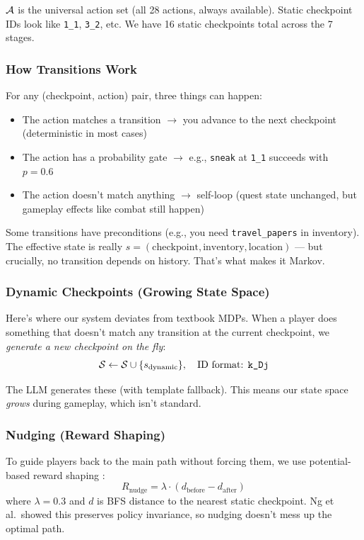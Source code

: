 $\mathcal{A}$ is the universal action set (all 28 actions, always available). Static checkpoint IDs look like \texttt{1\_1}, \texttt{3\_2}, etc. We have 16 static checkpoints total across the 7 stages.

\subsubsection{How Transitions Work}

For any (checkpoint, action) pair, three things can happen:
\begin{itemize}
    \item The action matches a transition $\to$ you advance to the next checkpoint (deterministic in most cases)
    \item The action has a probability gate $\to$ e.g., \texttt{sneak} at \texttt{1\_1} succeeds with $p = 0.6$
    \item The action doesn't match anything $\to$ self-loop (quest state unchanged, but gameplay effects like combat still happen)
\end{itemize}

Some transitions have preconditions (e.g., you need \texttt{travel\_papers} in inventory). The effective state is really $s = (\text{checkpoint}, \text{inventory}, \text{location})$ --- but crucially, no transition depends on history. That's what makes it Markov.

\subsubsection{Dynamic Checkpoints (Growing State Space)}

Here's where our system deviates from textbook MDPs. When a player does something that doesn't match any transition at the current checkpoint, we \emph{generate a new checkpoint on the fly}:
$$\mathcal{S} \leftarrow \mathcal{S} \cup \{s_{\text{dynamic}}\}, \quad \text{ID format: } \texttt{k\_Dj}$$

The LLM generates these (with template fallback). This means our state space \emph{grows} during gameplay, which isn't standard.

\subsubsection{Nudging (Reward Shaping)}

To guide players back to the main path without forcing them, we use potential-based reward shaping \cite{ng1999reward}:
$$R_{\text{nudge}} = \lambda \cdot (d_{\text{before}} - d_{\text{after}})$$
where $\lambda = 0.3$ and $d$ is BFS distance to the nearest static checkpoint. Ng et al.\ showed this preserves policy invariance, so nudging doesn't mess up the optimal path.

